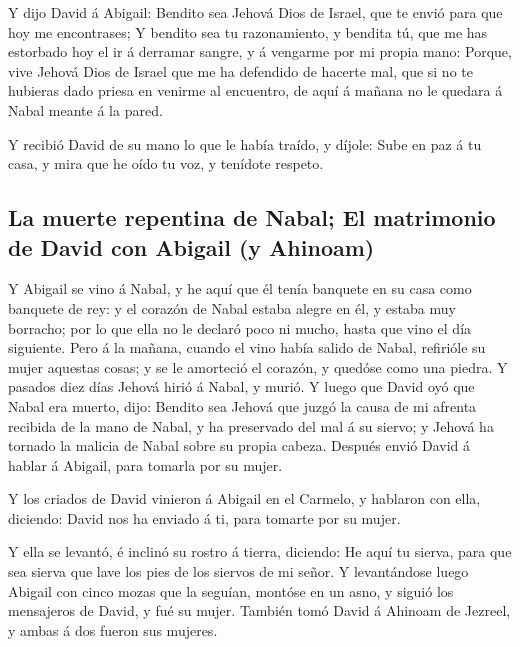  Y dijo David á Abigail: Bendito sea Jehová Dios de
Israel, que te envió para que hoy me encontrases;  Y
bendito sea tu razonamiento, y bendita tú, que me has estorbado hoy el
ir á derramar sangre, y á vengarme por mi propia mano: 
Porque, vive Jehová Dios de Israel que me ha defendido de hacerte mal,
que si no te hubieras dado priesa en venirme al encuentro, de aquí á
mañana no le quedara á Nabal meante á la pared.

 Y recibió David de su mano lo que le había traído, y
díjole: Sube en paz á tu casa, y mira que he oído tu voz, y tenídote
respeto.

\hypertarget{la-muerte-repentina-de-nabal-el-matrimonio-de-david-con-abigail-y-ahinoam}{%
\subsection{La muerte repentina de Nabal; El matrimonio de David con
Abigail (y
Ahinoam)}\label{la-muerte-repentina-de-nabal-el-matrimonio-de-david-con-abigail-y-ahinoam}}

 Y Abigail se vino á Nabal, y he aquí que él tenía
banquete en su casa como banquete de rey: y el corazón de Nabal estaba
alegre en él, y estaba muy borracho; por lo que ella no le declaró poco
ni mucho, hasta que vino el día siguiente.  Pero á la
mañana, cuando el vino había salido de Nabal, refirióle su mujer
aquestas cosas; y se le amorteció el corazón, y quedóse como una piedra.
 Y pasados diez días Jehová hirió á Nabal, y murió.
 Y luego que David oyó que Nabal era muerto, dijo:
Bendito sea Jehová que juzgó la causa de mi afrenta recibida de la mano
de Nabal, y ha preservado del mal á su siervo; y Jehová ha tornado la
malicia de Nabal sobre su propia cabeza. Después envió David á hablar á
Abigail, para tomarla por su mujer.

 Y los criados de David vinieron á Abigail en el Carmelo,
y hablaron con ella, diciendo: David nos ha enviado á ti, para tomarte
por su mujer.

 Y ella se levantó, é inclinó su rostro á tierra,
diciendo: He aquí tu sierva, para que sea sierva que lave los pies de
los siervos de mi señor.  Y levantándose luego Abigail
con cinco mozas que la seguían, montóse en un asno, y siguió los
mensajeros de David, y fué su mujer.  También tomó David
á Ahinoam de Jezreel, y ambas á dos fueron sus mujeres.


